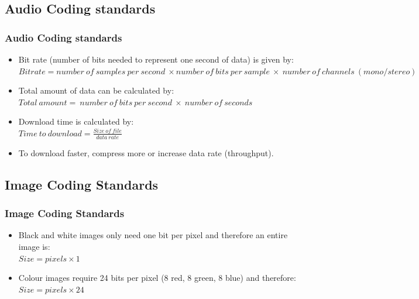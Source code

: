 \documentclass{beamer}
\begin{document}
\subsection{Audio Coding standards}
\begin{frame}
\frametitle{Audio Coding standards}
\begin{itemize}
\item {\color{red} Bit rate} (number of bits needed to represent one second of data) is given by:\\
{\scriptsize
$Bitrate = number \ of \ samples \ per \ second \ \times number \ of \ bits \ per \ sample \ \times \ number \ of \ channels \ (mono/stereo)$}
\item {\color{green} Total amount of data} can be calculated by:\\
{\scriptsize
$Total \ amount = \ number \ of \ bits \ per \ second \ \times \ number \ of \ seconds$}
\item {\color{purple}Download time} is calculated by:\\
{\scriptsize 
$Time \ to \ download = \frac{Size \ of \ file}{data \ rate}$}
\item To download faster, compress more or increase data rate (throughput).
\end{itemize}
\end{frame}

\subsection{Image Coding Standards}
\begin{frame}
\frametitle{Image Coding Standards}
\begin{itemize}
\item Black and white images only need one bit per pixel and therefore an entire image is:\\
$Size = pixels \times 1$
\item Colour images require 24 bits per pixel (8 red, 8 green, 8 blue) and therefore:\\
$Size = pixels \times 24$
\end{itemize}
\end{frame}
\end{document}
